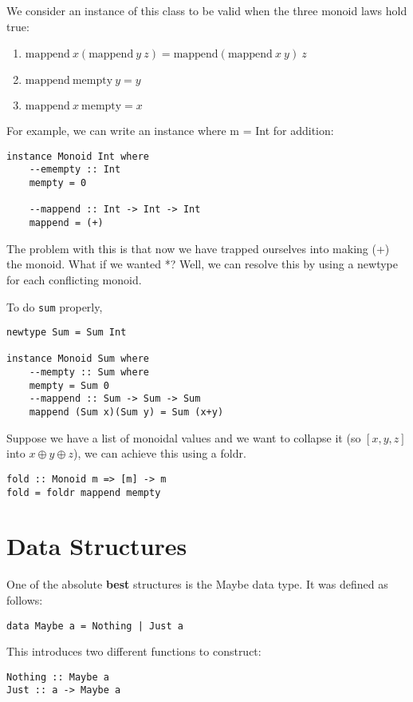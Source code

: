 \documentclass[11pt,a4paper,titlepage,dvipsnames,cmyk]{scrartcl}
\begin{document}
We consider an instance of this class to be valid when the three monoid
laws hold true:
\begin{enumerate}
    \item $\text{mappend} \ x (\text{mappend} \ y \ z) = \text{mappend}
        (\text{mappend} \ x \ y) \ z$
    \item $\text{mappend} \ \text{mempty} \ y = y$
    \item $\text{mappend} \ x \ \text{mempty} = x$
\end{enumerate}

For example, we can write an instance where m = Int for addition:
\begin{lstlisting}[style=B]
instance Monoid Int where
    --emempty :: Int
    mempty = 0
    
    --mappend :: Int -> Int -> Int
    mappend = (+)
\end{lstlisting}

The problem with this is that now we have trapped ourselves into making
(+) the monoid. What if we wanted *? Well, we can resolve this by using a
newtype for each conflicting monoid.

To do \lstinline|sum| properly,
\begin{lstlisting}[style=B]
newtype Sum = Sum Int

instance Monoid Sum where
    --mempty :: Sum where
    mempty = Sum 0
    --mappend :: Sum -> Sum -> Sum
    mappend (Sum x)(Sum y) = Sum (x+y)
\end{lstlisting}

Suppose we have a list of monoidal values and we want to collapse it (so
$[x, y, z]$ into $x \oplus y \oplus z$), we can achieve this using a
foldr.

\begin{lstlisting}[style=B]
fold :: Monoid m => [m] -> m
fold = foldr mappend mempty
\end{lstlisting}

\section{Data Structures}%
\label{sec:structs}
One of the absolute \textbf{best} structures is the Maybe data type. It
was defined as follows:
\begin{lstlisting}[style=B]
data Maybe a = Nothing | Just a
\end{lstlisting}

This introduces two different functions to construct:
\begin{lstlisting}[style=B]
Nothing :: Maybe a
Just :: a -> Maybe a
\end{lstlisting}
\end{document}
